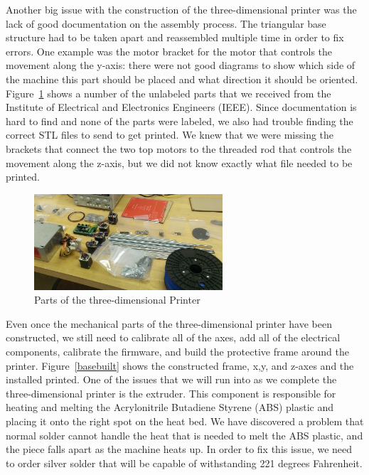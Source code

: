 \documentclass[pdftex,10.5pt]{report}
\begin{document}
Another big issue with the construction of the three-dimensional printer was the lack of good documentation on the assembly process. The triangular base structure had to be taken apart and reassembled multiple time in order to fix errors. One example was the motor bracket for the motor that controls the movement along the y-axis: there were not good diagrams to show which side of the machine this part should be placed and what direction it should be oriented. Figure~\ref{parts} shows a number of the unlabeled parts that we received from the Institute of Electrical and Electronics Engineers (IEEE). Since documentation is hard to find and none of the parts were labeled, we also had trouble finding the correct STL files to send to get printed. We knew that we were missing the brackets that connect the two top motors to the threaded rod that controls the movement along the z-axis, but we did not know exactly what file needed to be printed.

\begin{figure}[H]
	\centering
	\includegraphics[width=70mm]{figures/WP_20130223_002.jpg}
	\caption{Parts of the three-dimensional Printer}
	\label{parts}
\end{figure}

Even once the mechanical parts of the three-dimensional printer have been constructed, we still need to calibrate all of the axes, add all of the electrical components, calibrate the firmware, and build the protective frame around the printer. Figure~\ref{basebuilt} shows the constructed frame, x,y, and z-axes and the installed printed. One of the issues that we will run into as we complete the three-dimensional printer is the extruder. This component is responsible for heating and melting the Acrylonitrile Butadiene Styrene (ABS) plastic and placing it onto the right spot on the heat bed. We have discovered a problem that normal solder cannot handle the heat that is needed to melt the ABS plastic, and the piece falls apart as the machine heats up. In order to fix this issue, we need to order silver solder that will be capable of withstanding 221 degrees Fahrenheit. 
\end{document}
